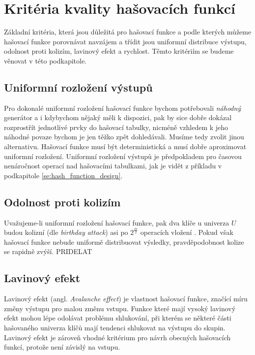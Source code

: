 \section{Kritéria kvality hašovacích funkcí}

Základní kritéria, která jsou důležitá pro hašovací funkce a podle kterých můžeme hašovací funkce
porovnávat navzájem a třídit jsou uniformní distribuce výstupu, odolnost proti kolizím, lavinový efekt
a rychlost. Těmto kritériím se budeme věnovat v této podkapitole. 

\subsection{Uniformní rozložení výstupů}

Pro dokonalé uniformní rozložení hašovací funkce bychom potřebovali \textit{náhodný}
generátor a i kdybychom nějaký měli k dispozici, pak by sice dobře dokázal 
rozprostřít jednotlivé prvky do hašovací tabulky, nicméně vzhledem k jeho náhodné 
povaze bychom je jen těžko zpět dohledávali. Musíme tedy zvolit jinou 
alternativu. Hašovací funkce musí být deterministická a musí dobře aproximovat
uniformní rozložení. Uniformní rozložení výstupů je předpokladem pro časovou nenáročnost operací nad hašovacími tabulkami,
jak je vidět z příkladu v podkapitole \ref{se:hash_function_design}. 

\subsection{Odolnost proti kolizím}

Uvažujeme-li uniformní rozložení hašovací funkce, pak dva klíče u univerza
$U$ budou kolizní (dle \textit{birthday attack}) asi po $2^{\frac{m}{2}}$ 
operacích vložení \cite{NCHF_auto_design}. Pokud však hašovací funkce nebude
uniformě distribuovat výsledky, pravděpodobnost kolize se rapidně zvýší. PRIDELAT

\subsection{Lavinový efekt}

Lavinový efekt (angl. \textit{Avalanche effect}) je vlastnost hašovací funkce, značící míru změny výstupu
pro malou změnu vstupu. 
Funkce které mají vysoký lavinový efekt mohou lépe odolávat problému shlukování,
při kterém se některé části hašovaného univerza klíčů mají tendenci shlukovat na výstupu
do skupin. Lavinový efekt je zároveň vhodné kritérium pro návrh obecných hašovacích funkcí,
protože není závislý na vstupu. 

